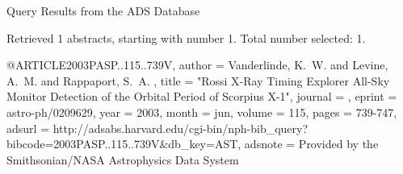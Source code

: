Query Results from the ADS Database


Retrieved 1 abstracts, starting with number 1.  Total number selected: 1.

@ARTICLE{2003PASP..115..739V,
   author = {{Vanderlinde}, K.~W. and {Levine}, A.~M. and {Rappaport}, S.~A.
	},
    title = "{Rossi X-Ray Timing Explorer All-Sky Monitor Detection of the Orbital Period of Scorpius X-1}",
  journal = {\pasp},
   eprint = {astro-ph/0209629},
     year = 2003,
    month = jun,
   volume = 115,
    pages = {739-747},
   adsurl = {http://adsabs.harvard.edu/cgi-bin/nph-bib_query?bibcode=2003PASP..115..739V&db_key=AST},
  adsnote = {Provided by the Smithsonian/NASA Astrophysics Data System}
}


